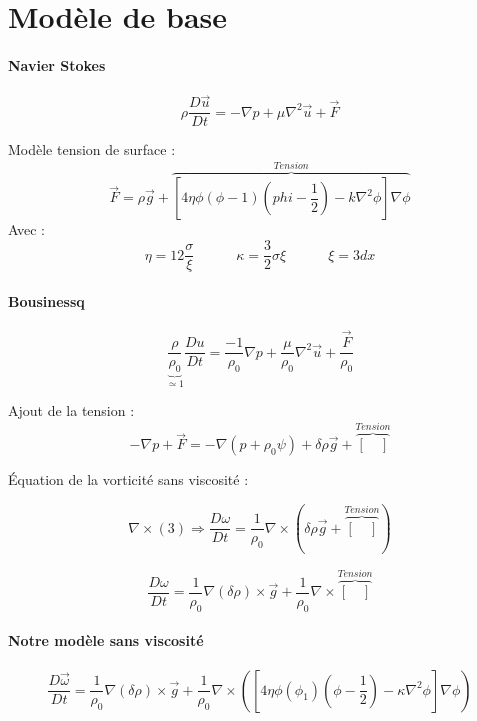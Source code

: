 \documentclass[10pt,a4paper]{article}
\author{Malo Kerebel}
\begin{document}
\section{Modèle de base}


\paragraph{Navier Stokes }

\begin{equation}
	\rho \dfrac{D \vec{u}}{D t} = - \nabla p + \mu \nabla^2 \vec{u} + \vec{F}
\end{equation}

Modèle tension de surface :
\begin{equation}
	\vec{F} = \rho \vec{g} + \overbrace{\left[ 4 \eta \phi (\phi - 1) \left(phi - \dfrac{1}{2} \right) - k\nabla^2 \phi \right] \nabla \phi}^{Tension}
\end{equation}
Avec :
\[
	\eta = 12 \dfrac{\sigma}{\xi} \quad \quad \quad \kappa = \dfrac{3}{2} \sigma \xi \quad \quad \quad \xi = 3 dx
\]

\paragraph{Bousinessq}

\begin{equation}
	\underbrace{\dfrac{\rho}{\rho_0}}_{\simeq 1} \dfrac{D u}{D t} = \dfrac{-1}{\rho_0} \nabla p + \dfrac{\mu }{\rho_0} \nabla^2 \vec{u} + \dfrac{\vec{F}}{\rho_0}
\end{equation}

Ajout de la tension :
\[
	-\nabla p + \vec{F} = - \nabla (p + \rho_0 \psi) + \delta \rho \vec{g} +  \overbrace{[\quad]}^{Tension}
\]

Équation de la vorticité sans viscosité :

\[
	\nabla \times (3) \Rightarrow \dfrac{D\omega}{D t} =  \dfrac{1}{\rho_0} \nabla \times \left( \delta \rho \vec{g} + \overbrace{[\quad]}^{Tension}\right)
\]

\[
	\dfrac{D\omega}{D t} = \dfrac{1}{\rho_0} \nabla (\delta \rho) \times \vec{g} + \dfrac{1}{\rho_0} \nabla \times \overbrace{[\quad]}^{Tension}
\]

\paragraph{Notre modèle sans viscosité }

\[
	\dfrac{D \vec{\omega}}{D t} = \dfrac{1}{\rho_0} \nabla (\delta \rho) \times \vec{g} + \dfrac{1}{\rho_0} \nabla \times \left( \left[ 4 \eta \phi (\phi_1) \left(\phi - \dfrac{1}{2}\right) - \kappa \nabla^2 \phi \right] \nabla \phi \right)
\]
\end{document}
